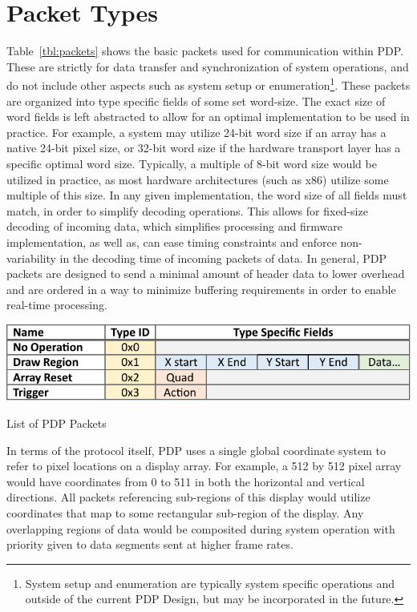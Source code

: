 \section{Packet Types}
    \label{sec:packet_types}

    Table~\ref{tbl:packets} shows the basic packets used for communication within PDP. These are strictly for data transfer and synchronization of system operations, and do not include other aspects such as system setup or enumeration\footnote{System setup and enumeration are typically system specific operations and outside of the current PDP Design, but may be incorporated in the future.}. These packets are organized into type specific fields of some set word-size. The exact size of word fields is left abstracted to allow for an optimal implementation to be used in practice. For example, a system may utilize 24-bit word size if an array has a native 24-bit pixel size, or 32-bit word size if the hardware transport layer has a specific optimal word size. Typically, a multiple of 8-bit word size would be utilized in practice, as most hardware architectures (such as x86) utilize some multiple of this size. In any given implementation, the word size of all fields must match, in order to simplify decoding operations. This allows for fixed-size decoding of incoming data, which simplifies processing and firmware implementation, as well as, can ease timing constraints and enforce non-variability in the decoding time of incoming packets of data. In general, PDP packets are designed to send a minimal amount of header data to lower overhead and are ordered in a way to minimize buffering requirements in order to enable real-time processing.

    \begin{table}
        \centering
        \includegraphics[width=1.0\textwidth]{fig/packet_chart.pdf}
        \caption{List of PDP Packets}
        \label{tbl:packets}
    \end{table}

    In terms of the protocol itself, PDP uses a single global coordinate system to refer to pixel locations on a display array. For example, a 512 by 512 pixel array would have coordinates from 0 to 511 in both the horizontal and vertical directions. All packets referencing sub-regions of this display would utilize coordinates that map to some rectangular sub-region of the display. Any overlapping regions of data would be composited during system operation with priority given to data segments sent at higher frame rates.

